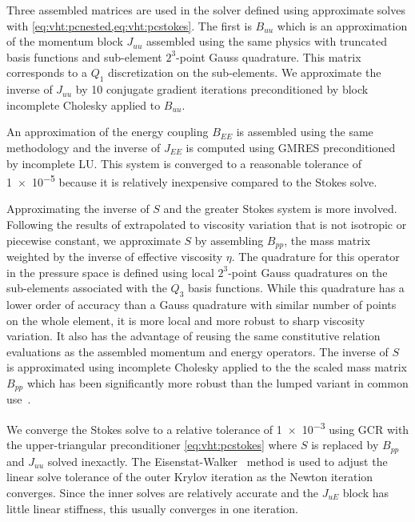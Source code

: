 Three assembled matrices are used in the solver defined using approximate solves with \eqref{eq:vht:pcnested,eq:vht:pcstokes}.
The first is $B_{uu}$ which is an approximation of the momentum block $J_{uu}$ assembled using the same physics with truncated basis functions and sub-element $2^3$-point Gauss quadrature.
This matrix corresponds to a $Q_1$ discretization on the sub-elements.
We approximate the inverse of $J_{uu}$ by 10 conjugate gradient iterations preconditioned by block incomplete Cholesky applied to $B_{uu}$.

An approximation of the energy coupling $B_{EE}$ is assembled using the same methodology and the inverse of $J_{EE}$ is computed using GMRES preconditioned by incomplete LU.
This system is converged to a reasonable tolerance of \num{1e-5} because it is relatively inexpensive compared to the Stokes solve.

Approximating the inverse of $S$ and the greater Stokes system is more involved.
Following the results of \citep{olshanskii2006analysis} extrapolated to viscosity variation that is not isotropic or piecewise constant, we approximate $S$ by assembling $B_{pp}$, the mass matrix weighted by the inverse of effective viscosity $\eta$.
The quadrature for this operator in the pressure space is defined using local $2^3$-point Gauss quadratures on the sub-elements associated with the $Q_3$ basis functions.
While this quadrature has a lower order of accuracy than a Gauss quadrature with similar number of points on the whole element, it is more local and more robust to sharp viscosity variation.
It also has the advantage of reusing the same constitutive relation evaluations as the assembled momentum and energy operators.
The inverse of $S$ is approximated using incomplete Cholesky applied to the the scaled mass matrix $B_{pp}$ which has been significantly more robust than the lumped variant in common use~\citep[\eg][]{burstedde2008scalable,may2008pim}.

We converge the Stokes solve to a relative tolerance of \num{1e-3} using GCR with the upper-triangular preconditioner \eqref{eq:vht:pcstokes} where $S$ is replaced by $B_{pp}$ and $J_{uu}$ solved inexactly.
The Eisenstat-Walker~\citet*{eisenstat1996cft} method is used to adjust the linear solve tolerance of the outer Krylov iteration as the Newton iteration converges.
Since the inner solves are relatively accurate and the $J_{uE}$ block has little linear stiffness, this usually converges in one iteration.

